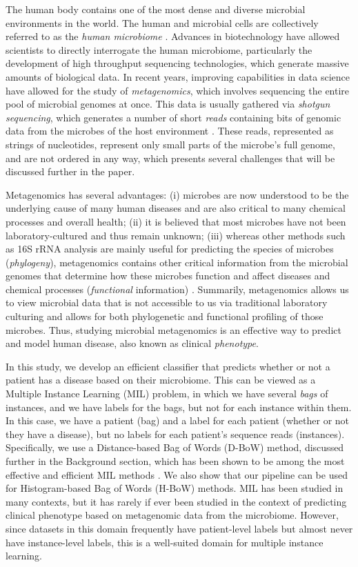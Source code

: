 
The human body contains one of the most dense and diverse microbial environments in the world. The human and microbial cells are collectively referred to as the \emph{human microbiome} \cite{turnbaugh_human_2007,backhed_host-bacterial_2005}. Advances in biotechnology have allowed scientists to directly interrogate the human microbiome, particularly the development of high throughput sequencing technologies, which generate massive amounts of biological data. In recent years, improving capabilities in data science have allowed for the study of \emph{metagenomics}, which involves sequencing the entire pool of microbial genomes at once. This data is usually gathered via \emph{shotgun sequencing}, which generates a number of short \emph{reads} containing bits of genomic data from the microbes of the host environment \cite{messing81}. These reads, represented as strings of nucleotides, represent only small parts of the microbe's full genome, and are not ordered in any way, which presents several challenges that will be discussed further in the paper. 

Metagenomics has several advantages: (i) microbes are now understood to be the underlying cause of many human diseases and are also critical to many chemical processes and overall health; (ii) it is believed that most microbes have not been laboratory-cultured and thus remain unknown; (iii) whereas other methods such as 16S rRNA analysis are mainly useful for predicting the species of microbes (\emph{phylogeny}), metagenomics contains other critical information from the microbial genomes that determine how these microbes function and affect diseases and chemical processes (\emph{functional} information) \cite{handelsman04}. Summarily, metagenomics allows us to view microbial data that is not accessible to us via traditional laboratory culturing and allows for both phylogenetic and functional profiling of those microbes. Thus, studying microbial metagenomics is an effective way to predict and model human disease, also known as clinical \emph{phenotype}.

In this study, we develop an efficient classifier that predicts whether or not a patient has a disease based on their microbiome. This can be viewed as a Multiple Instance Learning (MIL) problem, in which we have several \emph{bags} of instances, and we have labels for the bags, but not for each instance within them. In this case, we have a patient (bag) and a label for each patient (whether or not they have a disease), but no labels for each patient's sequence reads (instances). Specifically, we use a Distance-based Bag of Words (D-BoW) method, discussed further in the Background section, which has been shown to be among the most effective and efficient MIL methods \cite{amores13}. We also show that our pipeline can be used for Histogram-based Bag of Words (H-BoW) methods. MIL has been studied in many contexts, but it has rarely if ever been studied in the context of predicting clinical phenotype based on metagenomic data from the microbiome. However, since datasets in this domain frequently have patient-level labels but almost never have instance-level labels, this is a well-suited domain for multiple instance learning. 


